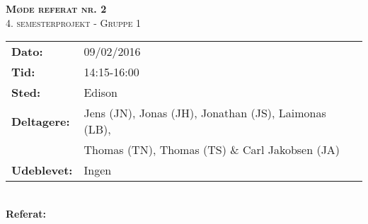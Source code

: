 
\newcommand{\HRule}{\rule{\linewidth}{0.1mm}}


	\begin{center}
		{\huge \bfseries \textsc{Møde referat nr. 2}}\\
		\textsc{\large 4. semesterprojekt - Gruppe 1}\\[0.3cm]
	\end{center}
	\begin{tabular}{ll}
	\large \textbf{Dato:} & 09/02/2016  \\ %
	\large \textbf{Tid:}  & 14:15-16:00 \\ %
	\large \textbf{Sted:} & Edison		\\ %
	\large \textbf{Deltagere:} & Jens (JN), Jonas (JH), Jonathan (JS), Laimonas (LB), \\
	\large \textbf & Thomas (TN),  Thomas (TS) \& Carl Jakobsen (JA)\\
	\large \textbf{Udeblevet:} & Ingen
	\end{tabular}\\
	\phantom{\,}\hspace{0.1em} \large \textbf{Referat:}
